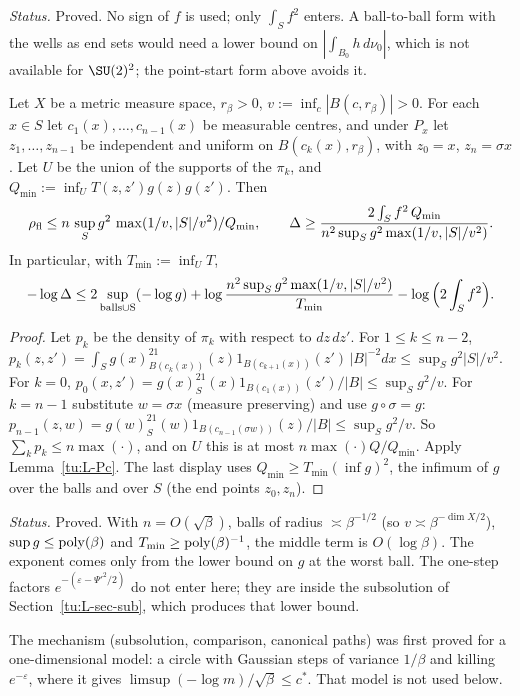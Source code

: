 \noindent\emph{Status.} Proved. No sign of $f$ is used; only $\int_Sf^2$ enters. A ball-to-ball
form with the wells as end sets would need a lower bound on $|\int_{B_0}h\,d\nu_0|$, which is not
available for $\SU(2)^2$; the point-start form above avoids it.

\begin{corollary}\label{tu:L-B}
Let $X$ be a metric measure space, $r_\beta>0$, $v:=\inf_c|B(c,r_\beta)|>0$. For each $x\in S$ let
$c_1(x),\dots,c_{n-1}(x)$ be measurable centres, and under $P_x$ let $z_1,\dots,z_{n-1}$ be
independent and uniform on $B(c_k(x),r_\beta)$, with $z_0=x$, $z_n=\sigma x$. Let $U$ be the union
of the supports of the $\pi_k$, and $Q_{\min}:=\inf_U T(z,z')g(z)g(z')$. Then
\[
\rho_{\rm fl}\le n\,\sup_S g^2\,\max(1/v,|S|/v^2)/Q_{\min},\qquad
\Delta\ge\frac{2\int_Sf^2\,Q_{\min}}{n^2\sup_Sg^2\max(1/v,|S|/v^2)} .
\]
In particular, with $T_{\min}:=\inf_UT$,
\[
-\log\Delta\le 2\sup_{\rm balls\cup S}(-\log g)+\log\frac{n^2\sup_Sg^2\max(1/v,|S|/v^2)}{T_{\min}}-\log\Big(2\int_Sf^2\Big).
\]
\end{corollary}

\begin{proof}
Let $p_k$ be the density of $\pi_k$ with respect to $dz\,dz'$. For $1\le k\le n-2$,
$p_k(z,z')=\int_Sg(x)^21_{B(c_k(x))}(z)1_{B(c_{k+1}(x))}(z')\,|B|^{-2}dx\le\sup_Sg^2|S|/v^2$.
For $k=0$, $p_0(x,z')=g(x)^21_S(x)1_{B(c_1(x))}(z')/|B|\le\sup_Sg^2/v$. For $k=n-1$ substitute
$w=\sigma x$ (measure preserving) and use $g\circ\sigma=g$:
$p_{n-1}(z,w)=g(w)^21_S(w)1_{B(c_{n-1}(\sigma w))}(z)/|B|\le\sup_Sg^2/v$. So
$\sum_kp_k\le n\max(\cdot)$, and on $U$ this is at most $n\max(\cdot)Q/Q_{\min}$. Apply
Lemma~\ref{tu:L-Pc}. The last display uses $Q_{\min}\ge T_{\min}(\inf g)^2$, the infimum of $g$ over
the balls and over $S$ (the end points $z_0,z_n$).
\end{proof}

\noindent\emph{Status.} Proved. With $n=O(\sqrt\beta)$, balls of radius $\asymp\beta^{-1/2}$ (so
$v\asymp\beta^{-\dim X/2}$), $\sup g\le{\rm poly}(\beta)$ and $T_{\min}\ge{\rm poly}(\beta)^{-1}$, the
middle term is $O(\log\beta)$. The exponent comes only from the lower bound on $g$ at the worst ball.
The one-step factors $e^{-(\varepsilon-\Psi'^2/2)}$ do not enter here; they are inside the
subsolution of Section~\ref{tu:L-sec-sub}, which produces that lower bound.

\begin{remark}
The mechanism (subsolution, comparison, canonical paths) was first proved for a one-dimensional model:
a circle with Gaussian steps of variance $1/\beta$ and killing $e^{-\varepsilon}$, where it gives
$\limsup(-\log m)/\sqrt\beta\le c^*$. That model is not used below.
\end{remark}

